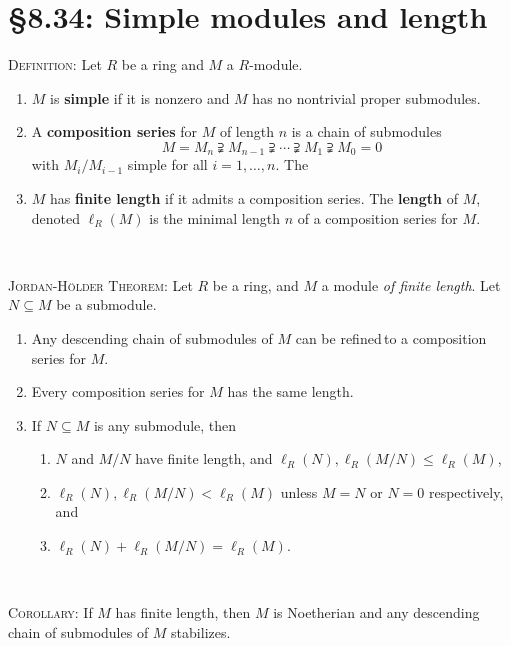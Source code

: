 \documentclass[12pt]{amsart}
\renewcommand{\1}{\mathbbm{1}}
\newcommand{\showsol}[1]{\def\displaysol{#1}}
\begin{document}
\showsol{1}
	
	\thispagestyle{empty}
	
	\section*{\S8.34: Simple modules and length}
	
	\begin{framed}
	
	\noindent	\textsc{Definition:} Let $R$ be a ring and $M$ a $R$-module.
	\begin{enumerate}
	\item $M$ is \textbf{simple} if it is nonzero and $M$ has no nontrivial proper submodules.
	\item A \textbf{composition series} for $M$ of length $n$ is a chain of submodules
	\[ M = M_n \supsetneqq M_{n-1} \supsetneqq \cdots \supsetneqq M_1 \supsetneqq M_0 = 0\]
	with $M_{i}/M_{i-1}$ simple for all $i=1,\dots,n$. The
	\item $M$ has \textbf{finite length} if it admits a composition series. The \textbf{length} of $M$, denoted $\ell_R(M)$ is the minimal length $n$ of a composition series for $M$.
	\end{enumerate}
	
		\
	
	\noindent \textsc{Jordan-H\"older Theorem:} Let $R$ be a ring, and $M$ a module \emph{of finite length}.
Let $N\subseteq M$ be a submodule.
	\begin{enumerate}
	\item Any descending chain of submodules of $M$ can be refined\footnotemark \,to a composition series for $M$.
	\item Every composition series for $M$ has the same length.
	\item If $N\subseteq M$ is any submodule, then 
	\begin{enumerate}
	\item $N$ and $M/N$ have finite length, and $\ell_R(N), \ell_R(M/N) \leq \ell_R(M)$,
	\item $\ell_R(N), \ell_R(M/N) <\ell_R(M)$ unless $M=N$ or $N=0$ respectively, and
	\item $\ell_R(N)+\ell_R(M/N)=\ell_R(M)$.
	\end{enumerate}
	\end{enumerate}
	
	\
	
		\noindent \textsc{Corollary:} If $M$ has finite length, then $M$ is Noetherian and any descending chain of submodules of $M$ stabilizes.


\end{framed}
\end{document}

